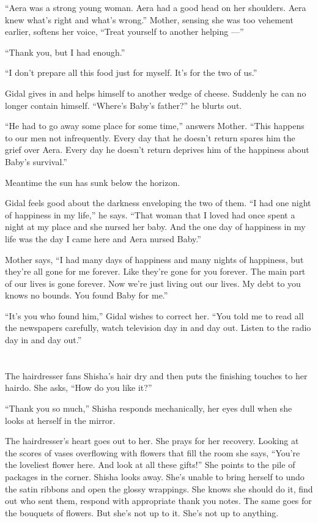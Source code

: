 \documentclass[twoside,11pt,openany]{book}
\begin{document}
``Aera was a strong young woman. Aera had a good head on her shoulders. Aera knew what's right and what's
wrong.'' Mother, sensing she was too vehement earlier, softens her voice, ``Treat yourself to
another helping ---''

``Thank you, but I had enough.''

``I don't prepare all this food just for myself. It's for the two of us.''

Gidal gives in and helps himself to another wedge of cheese. Suddenly he can no longer contain
himself.  ``Where's Baby's father?'' he blurts out.

``He had to go away some place for some time,'' answers Mother. ``This happens to
our men not infrequently. Every day that he doesn't return spares him the grief over Aera. Every day he doesn't return
deprives him of the happiness about Baby's survival.''

Meantime the sun has sunk below the horizon.

Gidal feels good about the darkness enveloping the two of them. ``I had one night of happiness in my
life,'' he says. ``That woman that I loved had once spent a night at my place and she nursed
her baby.  And the{ }one day\textit{ }of happiness in my life was the day I
came here and Aera nursed Baby.''

Mother says, ``I had many days of happiness and many nights of happiness, but they're all gone for me
forever. Like they're gone for you forever. The main part of our lives is gone forever. Now we're just living out our
lives. My debt to you knows no bounds. You found Baby for me.''

``It's you who found him,'' Gidal wishes to correct her. ``You told me to read
all the newspapers carefully, watch television day in and day out.
Listen to the radio day in and day out.''



\chapter{}

The hairdresser fans Shisha's hair dry and then puts the finishing touches to her hairdo. She asks, ``How
do you like it?''

``Thank you so much,'' Shisha responds mechanically, her eyes dull  when she looks at herself
in the mirror.

The hairdresser's heart goes out to her. She prays for her recovery. Looking at the scores of vases overflowing with
flowers that fill the room she says, ``You're the loveliest flower here. And look at all these
gifts!''  She points to the pile of packages in the corner. Shisha looks away. She's unable to bring
herself to undo the satin ribbons and open the glossy wrappings. She knows she should do it, find out who sent them,
respond with appropriate thank you notes. The same goes for the bouquets of flowers. But she's not up to it.
She's not up to anything.
\end{document}
